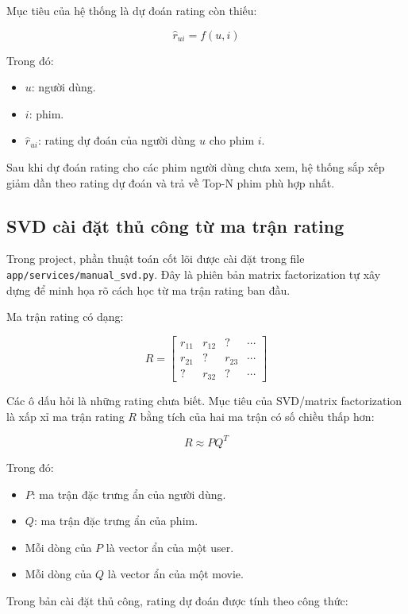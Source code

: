 \documentclass[12pt,a4paper]{article}
\begin{document}
Mục tiêu của hệ thống là dự đoán rating còn thiếu:

\[
\hat{r}_{ui} = f(u, i)
\]

Trong đó:

\begin{itemize}
    \item \(u\): người dùng.
    \item \(i\): phim.
    \item \(\hat{r}_{ui}\): rating dự đoán của người dùng \(u\) cho phim \(i\).
\end{itemize}

Sau khi dự đoán rating cho các phim người dùng chưa xem, hệ thống sắp xếp giảm dần theo rating dự đoán và trả về Top-N phim phù hợp nhất.

\subsection{SVD cài đặt thủ công từ ma trận rating}

Trong project, phần thuật toán cốt lõi được cài đặt trong file \texttt{app/services/manual\_svd.py}. Đây là phiên bản matrix factorization tự xây dựng để minh họa rõ cách học từ ma trận rating ban đầu.

Ma trận rating có dạng:

\[
R =
\begin{bmatrix}
r_{11} & r_{12} & ? & \cdots \\
r_{21} & ? & r_{23} & \cdots \\
? & r_{32} & ? & \cdots
\end{bmatrix}
\]

Các ô dấu hỏi là những rating chưa biết. Mục tiêu của SVD/matrix factorization là xấp xỉ ma trận rating \(R\) bằng tích của hai ma trận có số chiều thấp hơn:

\[
R \approx P Q^T
\]

Trong đó:

\begin{itemize}
    \item \(P\): ma trận đặc trưng ẩn của người dùng.
    \item \(Q\): ma trận đặc trưng ẩn của phim.
    \item Mỗi dòng của \(P\) là vector ẩn của một user.
    \item Mỗi dòng của \(Q\) là vector ẩn của một movie.
\end{itemize}

Trong bản cài đặt thủ công, rating dự đoán được tính theo công thức:
\end{document}

